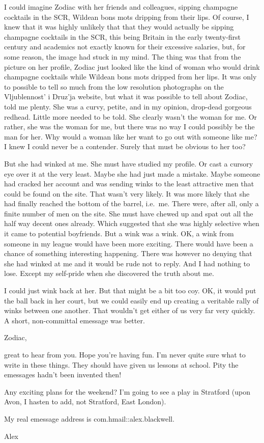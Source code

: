 I could imagine Zodiac with her friends and colleagues, sipping
champagne cocktails in the SCR, Wildean {\twelveit bons mots\/}
dripping from their lips. Of course, I knew that it was highly
unlikely that that they would actually be sipping champagne
cocktails in the SCR, this being Britain in the early twenty-first
century and academics not exactly known for their excessive
salaries, but, for some reason, the image had stuck in my mind. The
thing was that from the picture on her profile, Zodiac just looked
like the kind of woman who would drink champagne cocktails while
Wildean {\twelveit bons mots\/} dripped from her lips. It was only
to possible to tell so much from the low resolution photographs on
the Vljublennost' i Druz'ja website, but what it was possible to
tell about Zodiac, told me plenty. She was a curvy, petite, and in
my opinion, drop-dead gorgeous redhead. Little more needed to be
told. She clearly wasn't the woman for me. Or rather, she was the
woman for me, but there was no way I could possibly be the man for
her. Why would a woman like her want to go out with someone like me?
I knew I could never be a contender. Surely that must be obvious to
her too?

But she had winked at me. She must have studied my profile. Or cast
a cursory eye over it at the very least. Maybe she had just made a
mistake. Maybe someone had cracked her account and was sending winks
to the least attractive men that could be found on the site. That
wasn't very likely. It was more likely that she had finally reached
the bottom of the barrel, i.e.~me. There were, after all, only a
finite number of men on the site. She must have chewed up and spat
out all the half way decent ones already. Which suggested that she
was highly selective when it came to potential boyfriends. But a
wink was a wink. OK, a wink from someone in my league would have
been more exciting. There would have been a chance of something
interesting happening. There was however no denying that she had
winked at me and it would be rude not to reply. And I had nothing to
lose. Except my self-pride when she discovered the truth about me.

I could just wink back at her. But that might be a bit too coy. OK,
it would put the ball back in her court, but we could easily end up
creating a veritable rally of winks between one another. That
wouldn't get either of us very far very quickly. A short,
non-committal emessage was better.

{\twelvett Zodiac,

great to hear from you. Hope you're having fun. I'm never quite sure
what to write in these things. They should have given us lessons at
school. Pity the emessages hadn't been invented then!

Any exciting plans for the weekend? I'm going to see a play in
Stratford (upon Avon, I hasten to add, not Stratford, East London).

My real emessage address is com.hmail::alex.blackwell.

Alex}

